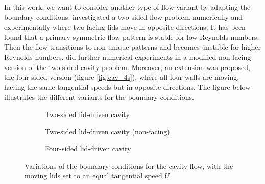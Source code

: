 In this work, we want to consider another type of flow variant by adapting the
boundary conditions. \cite{kuhlmann1997} investigated a two-sided flow problem
numerically and experimentally where two facing lids move in opposite
directions. It has been found that a primary symmetric flow pattern is stable
for low Reynolds numbers. Then the flow transitions to non-unique patterns and
becomes unstable for higher Reynolds numbers. \citet{wahba2009} did further
numerical experiments in a modified non-facing version of the two-sided cavity
problem. Moreover, an extension was proposed, the four-sided version (figure
\ref{fig:cav_4s}), where all four walls are moving, having the same tangential
speeds but in opposite directions. The figure below illustrates the different
variants for the boundary conditions.

\begin{figure}[ht]
\centering
\begin{subfigure}[b]{0.3\textwidth}
  \centering
  \caption{Two-sided lid-driven cavity \\ \hspace{\textwidth}}
  \label{subfig:bc_2s}
\end{subfigure}
\begin{subfigure}[b]{0.3\textwidth}
  \centering
  \caption{Two-sided lid-driven cavity (non-facing)}
  \label{subfig:bc_2s_nf}
\end{subfigure}
\begin{subfigure}[b]{0.3\textwidth}
  \centering
  \caption{Four-sided lid-driven cavity \\ \hspace{\textwidth}}
  \label{subfig:bc_4s}
\end{subfigure}

\caption{Variations of the boundary conditions for the cavity flow,
 with the moving lids set to an equal tangential speed $U$}
\label{fig:bc_types}
\end{figure}

